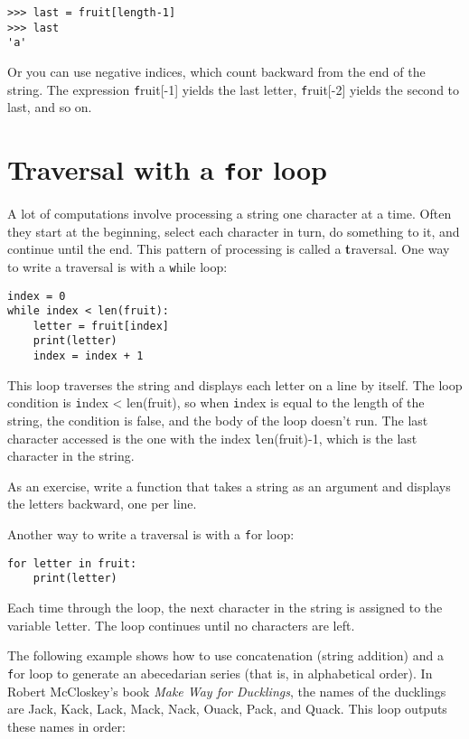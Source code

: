\documentclass[
DIV=11,
fontsize=12,
twoside,
headinclude=false,
titlepage=firstiscover,
abstract=true,
headsepline=true,
footsepline=true,
chapterprefix=true, %
headings=big,
bibliography=totoc,%
captions=tableheading
]{scrbook}
\theoremstyle{definition}
\begin{document}
\begin{lstlisting}
>>> last = fruit[length-1]
>>> last
'a'
\end{lstlisting}
%
Or you can use negative indices, which count backward from
the end of the string.  The expression {\texttt fruit[-1]} yields the last
letter, {\texttt fruit[-2]} yields the second to last, and so on.


\section{Traversal with a {\texttt for} loop}
\label{for}

A lot of computations involve processing a string one character at a
time.  Often they start at the beginning, select each character in
turn, do something to it, and continue until the end.  This pattern of
processing is called a {\textbf traversal}.  One way to write a traversal
is with a {\texttt while} loop:

\begin{lstlisting}
index = 0
while index < len(fruit):
    letter = fruit[index]
    print(letter)
    index = index + 1
\end{lstlisting}
%
This loop traverses the string and displays each letter on a line by
itself.  The loop condition is {\texttt index < len(fruit)}, so
when {\texttt index} is equal to the length of the string, the
condition is false, and the body of the loop doesn't run.  The
last character accessed is the one with the index {\texttt len(fruit)-1},
which is the last character in the string.

As an exercise, write a function that takes a string as an argument
and displays the letters backward, one per line.

Another way to write a traversal is with a {\texttt for} loop:

\begin{lstlisting}
for letter in fruit:
    print(letter)
\end{lstlisting}
%
Each time through the loop, the next character in the string is assigned
to the variable {\texttt letter}.  The loop continues until no characters are
left.

The following example shows how to use concatenation (string addition)
and a {\texttt for} loop to generate an abecedarian series (that is, in
alphabetical order).  In Robert McCloskey's book {\em Make
Way for Ducklings}, the names of the ducklings are Jack, Kack, Lack,
Mack, Nack, Ouack, Pack, and Quack.  This loop outputs these names in
order:
\end{document}
